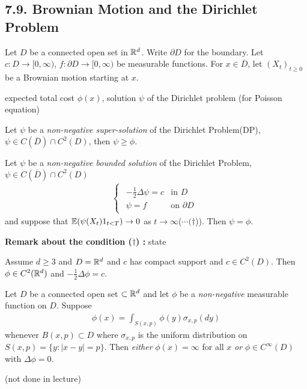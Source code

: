 \documentclass[10pt,a4paper]{report}
\begin{document}
\subsection*{7.9. Brownian Motion and the Dirichlet Problem}

Let $D$ be a connected open set in $\mathbb{R}^d$. Write $\partial D$ for the boundary. Let $c: D \rightarrow [0,\infty)$, $f: \partial D \rightarrow [0,\infty)$ be measurable functions. For $x\in \overline{D}$, let $(X_t)_{t\geq 0}$ be a Brownian motion starting at $x$.

\quad expected total cost $\phi(x)$, solution $\psi$ of the Dirichlet problem (for Poisson equation)
\s

 Let $\psi$ be a \emph{non-negative super-solution} of the Dirichlet Problem(DP), $\psi \in C(\overline{D}) \cap C^2(D)$, then $\psi \geq \phi$.
\s

 Let $\psi$ be a \emph{non-negative bounded solution} of the Dirichlet Problem, $\psi \in C(\overline{D}) \cap C^2(D)$
\begin{align*}
\begin{cases}
\begin{array}{ll}
-\frac{1}{2} \Delta \psi = c & \text{in } D \\
\psi = f & \text{on } \partial D
\end{array}
\end{cases}
\end{align*}
and suppose that $\mathbb{E}(\psi(X_t)1_{t<T}) \rightarrow 0$ as $t\rightarrow \infty$($\cdots (\dagger$)). Then $\psi = \phi$.

\textbf{Remark about the condition ($\dagger$) :} state
\s

 Assume $d\geq 3$ and $D= \mathbb{R}^d$ and $c$ has compact support and $c\in C^2(D)$. Then $\phi \in C^2(\mathbb{R}^d)$ and $-\frac{1}{2} \Delta \phi =c$.
\s

 Let $D$ be a connected open set $\subset \mathbb{R}^d$ and let $\phi$ be a \emph{non-negative} measurable function on $D$. Suppose
\begin{align*}
\phi(x) = \int_{S(x,p)} \phi(y) \sigma_{x,p}(dy)
\end{align*}
whenever $B(x,p) \subset D$ where $\sigma_{x,p}$ is the uniform distribution on $S(x,p) = \{ y : |x-y| =p \}$. Then \emph{either} $\phi(x) = \infty$ for all $x$ \emph{or} $\phi \in C^{\infty}(D)$ with $\Delta \phi =0$.

(not done in lecture)
\s
\end{document}
